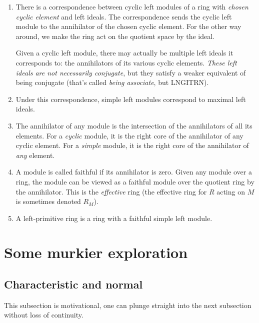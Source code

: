 \documentclass[a4paper]{amsart}
\begin{document}
\begin{enumerate}

\item There is a correspondence between cyclic left modules of a ring
  with {\em chosen cyclic element} and left ideals. The correspondence
  sends the cyclic left module to the annihilator of the chosen cyclic
  element. For the other way around, we make the ring act on the
  quotient space by the ideal.

  Given a cyclic left module, there may actually be multiple left
  ideals it corresponds to: the annihilators of its various cyclic
  elements. {\em These left ideals are not necessarily conjugate}, but
  they satisfy a weaker equivalent of being conjugate (that's called
  {\em being associate}, but LNGITRN).

\item Under this correspondence, simple left modules correspond to
  maximal left ideals.

\item The annihilator of any module is the intersection of the
  annihilators of all its elements. For a {\em cyclic} module, it is
  the right core of the annihilator of any cyclic element. For a {\em
    simple} module, it is the right core of the annihilator of {\em
    any} element.

\item A module is called faithful if its annihilator is zero. Given
  any module over a ring, the module can be viewed as a faithful
  module over the quotient ring by the annihilator. This is the {\em
    effective} ring (the effective ring for $R$ acting on $M$ is
  sometimes denoted $R_M$).

\item A left-primitive ring is a ring with a faithful simple left module.

\end{enumerate}

\section{Some murkier exploration}

\subsection{Characteristic and normal}

This subsection is motivational, one can plunge straight into the next
subsection without loss of continuity.
\end{document}
